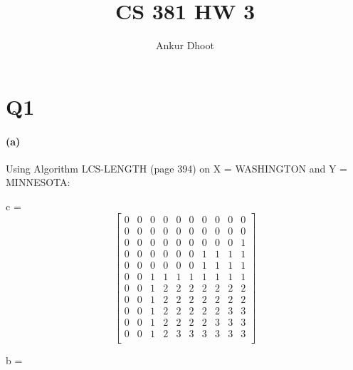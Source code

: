 \documentclass[11pt,a4paper]{article}
\begin{document}
\author{Ankur Dhoot}
\title{CS 381 HW 3}
\maketitle

\section*{Q1}

\paragraph{(a)}
Using Algorithm LCS-LENGTH (page 394) on X = WASHINGTON and Y = MINNESOTA:

c = 
\[
	\begin{bmatrix}
  0 & 0 & 0 & 0 & 0 & 0 & 0 & 0 & 0 & 0 \\
 
  0 & 0 & 0 & 0 & 0 & 0 & 0 & 0 & 0 & 0 \\
 
  0 & 0 & 0 & 0 & 0 & 0 & 0 & 0 & 0 & 1 \\
 
  0 & 0 & 0 & 0 & 0 & 0 & 1 & 1 & 1 & 1 \\
 
  0 & 0 & 0 & 0 & 0 & 0 & 1 & 1 & 1 & 1 \\
 
  0 & 0 & 1 & 1 & 1 & 1 & 1 & 1 & 1 & 1 \\
 
  0 & 0 & 1 & 2 & 2 & 2 & 2 & 2 & 2 & 2 \\
 
  0 & 0 & 1 & 2 & 2 & 2 & 2 & 2 & 2 & 2 \\
 
  0 & 0 & 1 & 2 & 2 & 2 & 2 & 2 & 3 & 3 \\
 
  0 & 0 & 1 & 2 & 2 & 2 & 2 & 3 & 3 & 3 \\
 
  0 & 0 & 1 & 2 & 3 & 3 & 3 & 3 & 3 & 3 \\

\end{bmatrix} 
 	\]

b = 
 
\end{document}

